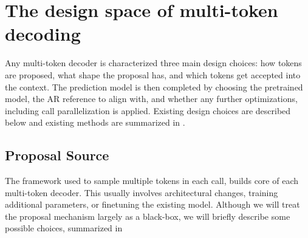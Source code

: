 \documentclass{article} %
\makeatletter
\newenvironment{ai}
  {\color{lightgray}%
   \@ifpackageloaded{caption}{\captionsetup{font={color=lightgray}}}{}%
   \let\ai@savedfloatreset\@floatboxreset
   \g@addto@macro\@floatboxreset{\color{lightgray}}}
  {\global\let\@floatboxreset\ai@savedfloatreset}
\makeatother
\begin{document}
\begin{ai}
\begin{table}[t]
  \centering
  \caption{The Spec-Bench baselines, resolved along the three axes. ``guarantee''
  is what the method promises about its output: \emph{exact} preserves the base
  model's distribution, \emph{greedy} reproduces greedy decoding only,
  \emph{biased} gives up both by design. ``overlap'' is what runs concurrently
  with verification. $p$ is the base model's distribution, $q$ / $\hat p$ the
  proposal model's, $c_j$ its confidence at node $j$, $H$ the entropy.
  ``trained'' is what must be fitted before the method can be used: four of the
  nine need nothing. $^\ast$SpS trains nothing but requires a second, smaller
  model of the same family to exist. $^\dagger$SAMD is training-free in its
  retrieval-only form; its strongest reported configuration falls back to a
  trained drafter when retrieval misses.}
  \label{tab:baselines}
  
\end{table}
\end{ai}

\section{The design space of multi-token decoding}
\label{sec:design}

Any multi-token decoder is characterized three main design choices: how tokens are proposed, what shape the proposal has, and which tokens get accepted into the context. The prediction model is then completed by choosing the pretrained model, the AR reference to align with, and whether any further optimizations, including call parallelization is applied.
Existing design choices are described below and existing methods are summarized in .

\subsection{Proposal Source}
\label{sec:proposal}

The framework used to sample multiple tokens in each call, builds core of each multi-token decoder. This usually involves architectural changes, training additional parameters, or finetuning the existing model. Although we will treat the proposal mechanism largely as a black-box, we will briefly describe some possible choices, summarized in 
\end{document}
